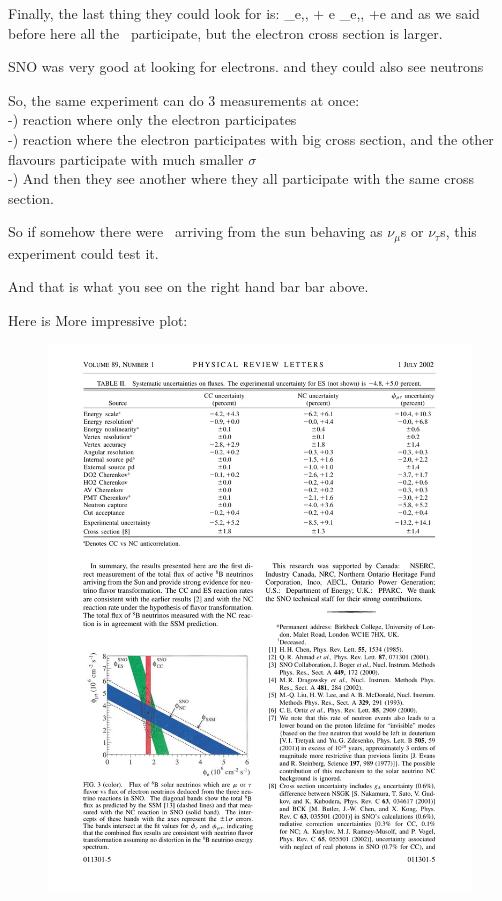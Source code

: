 {Finally,  the last thing they could look for is:
\be
\nu_{e,\mu,\tau} + e  \rightarrow \nu_{e,\mu,\tau} +e
\ee
and as we said before here all the \nus\ participate, but the electron cross section is larger.

SNO was very good at looking for electrons. and they could also see neutrons

So, the same experiment can do 3 measurements at once:\\
 -) reaction where only the electron participates\\
 -) reaction where the electron participates with big cross section, and the other flavours participate with much smaller $\sigma$\\
 -) And then they see another where they all participate with the same cross section. 


So if somehow there were \nus\ arriving from the sun behaving as $\nu_\mu$s or $\nu_\tau$s, this experiment could test it. 

And that is what you see on the right hand bar bar above. 

Here is More impressive plot: 

\begin{figure}[h!]
\centering
\includegraphics[width=1.0\textwidth]{./SNOResult.pdf}
\end{figure}

}
